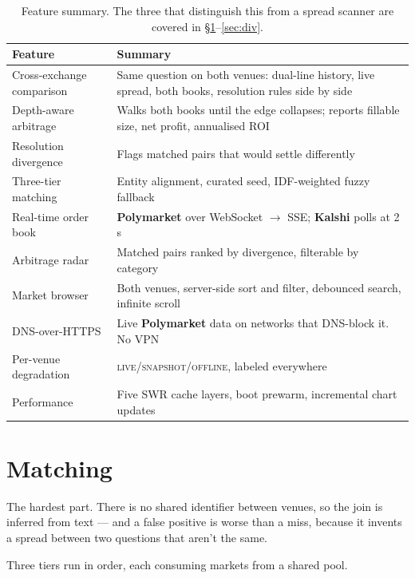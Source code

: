 \documentclass[11pt,a4paper]{article}
\newcommand{\PM}{{\color{poly}\textbf{Polymarket}}}
\newcommand{\KS}{{\color{kalshi}\textbf{Kalshi}}}
\begin{document}
\begin{table}[htbp]
\centering\small
\begin{tabularx}{\textwidth}{@{}p{4.2cm}X@{}}
\toprule
\textbf{Feature} & \textbf{Summary} \\
\midrule
Cross-exchange comparison & Same question on both venues: dual-line history, live spread, both
  books, resolution rules side by side \\
Depth-aware arbitrage & Walks both books until the edge collapses; reports fillable size, net
  profit, annualised ROI \\
Resolution divergence & Flags matched pairs that would settle differently \\
Three-tier matching & Entity alignment, curated seed, IDF-weighted fuzzy fallback \\
Real-time order book & \PM{} over WebSocket $\rightarrow$ SSE; \KS{} polls at 2\,s \\
Arbitrage radar & Matched pairs ranked by divergence, filterable by category \\
Market browser & Both venues, server-side sort and filter, debounced search, infinite scroll \\
DNS-over-HTTPS & Live \PM{} data on networks that DNS-block it. No VPN \\
Per-venue degradation & \textsc{live}/\textsc{snapshot}/\textsc{offline}, labeled everywhere \\
Performance & Five SWR cache layers, boot prewarm, incremental chart updates \\
\bottomrule
\end{tabularx}
\caption{Feature summary. The three that distinguish this from a spread scanner are covered in
\S\ref{sec:match}--\ref{sec:div}.}
\end{table}

\section{Matching}
\label{sec:match}

The hardest part. There is no shared identifier between venues, so the join is inferred from
text --- and a false positive is worse than a miss, because it invents a spread between two
questions that aren't the same.

Three tiers run in order, each consuming markets from a shared pool.
\end{document}
